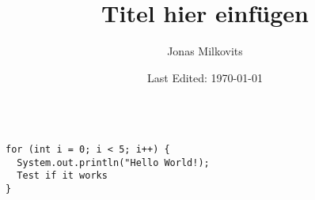 


\begin{titlepage}
  \title{Titel hier einfügen} %
  \author{Jonas Milkovits}
  \date{Last Edited: \today}
\end{titlepage}



\maketitle
{} %
\tableofcontents
\clearpage
{} %


\begin{verbatim}

for (int i = 0; i < 5; i++) {
  System.out.println("Hello World!);
  Test if it works
}

\end{verbatim}





